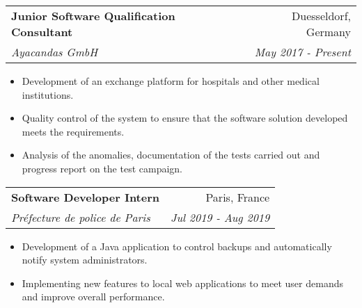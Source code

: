 \documentclass[a4paper,11pt]{article}
\makeatletter
\newcommand{\resumeItem}[2]{
  \item\small{
    \textbf{#1}{ #2 \vspace{-2pt}}
  }
}
\newcommand{\resumeSubheading}[4]{
  \vspace{-1pt}\item
    \begin{tabular*}{0.97\textwidth}{l@{\extracolsep{\fill}}r}
      \textbf{#1} & #2 \\
      \textit{\small#3} & \textit{\small #4} \\
    \end{tabular*}\vspace{-5pt}
}
\newcommand{\resumeItemListStart}{\begin{itemize}}
\newcommand{\resumeItemListEnd}{\end{itemize}\vspace{-5pt}}
\makeatother
\begin{document}
    \resumeSubheading
      {Junior Software Qualification Consultant}{Duesseldorf, Germany}
      {Ayacandas GmbH}{May 2017 - Present}
      \resumeItemListStart
        \resumeItem{}
          {Development of an exchange platform for hospitals and other medical institutions.}
        \resumeItem{}
          {Quality control of the system to ensure that the software solution developed meets the requirements.}
        \resumeItem{}
          {Analysis of the anomalies, documentation of the tests carried out and progress report on the test campaign.}
      \resumeItemListEnd
      
    \resumeSubheading
      {Software Developer Intern}{Paris, France}
      {Préfecture de police de Paris}{Jul 2019 - Aug 2019}
      \resumeItemListStart
        \resumeItem{}
          {Development of a Java application to control backups and automatically notify system administrators.}
        \resumeItem{}
          {Implementing new features to local web applications to meet user demands and improve overall performance.}
      \resumeItemListEnd

\iffalse
    \resumeSubheading
      {Assistant IT Administrator}{Düsseldorf, Germany}
      {Baum Reiter \& Collegen}{July 2018 - Aug 2018}
      \resumeItemListStart
        \resumeItem{}
          {Participation in the creation and automation of complaints.}
        \resumeItem{}
          {Assistance and advice of users on site.}
        \resumeItem{}
          {Supervision of cloud platforms.}
      \resumeItemListEnd
      
      \resumeSubheading
      {Student Trainee in IT Services}{Mohneim, Germany}
      {Sinell EDV Zubehör GmbH}{Jan 2018 - Feb 2018}
      \resumeItemListStart
        \resumeItem{}
          {Observation in the design, installation and maintenance of high-end firewall, client-server and VPN solutions.}
        \resumeItem{}
          {Repairs on laptops / PCs / server systems.}
        \resumeItem{}
          {Networking of high-end printers.}
        \resumeItem{}
          {Mission as Computer Maintenance Technician at the Cologne Hospital.}
      \resumeItemListEnd
      
      \resumeSubheading
      {Factory Worker}{Hilden, Germany}
      {Gebr. Wielpütz GmbH \& Co. KG}{July 2016 - Aug 2016}
      \resumeItemListStart
        \resumeItem{}
          {Machine operation of automated machines.}
        \resumeItem{}
          {Quality control, assembly, test.}
        \resumeItem{}
          {Transport activities.}
        \resumeItem{}
          {Cleaning work / machine maintenance.}
      \resumeItemListEnd
\fi
\end{document}
